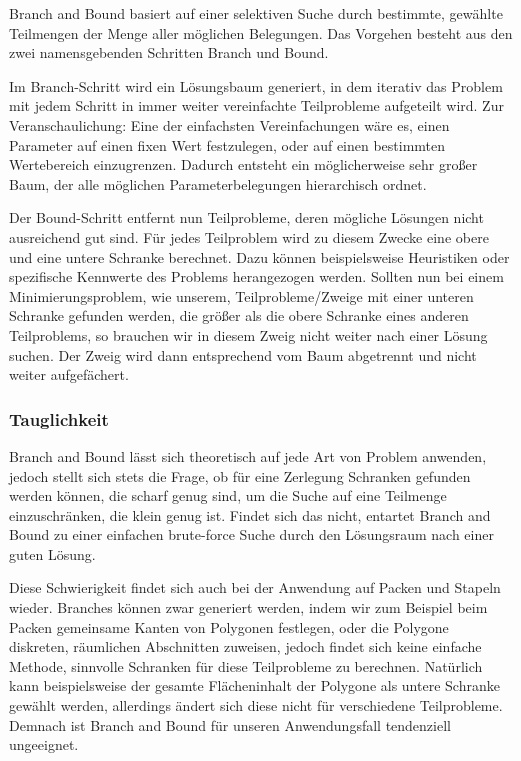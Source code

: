 \documentclass[runningheads,a4paper]{llncs}
\begin{document}
Branch and Bound basiert auf einer selektiven Suche durch bestimmte, gewählte Teilmengen der Menge aller möglichen Belegungen. Das Vorgehen besteht aus den zwei namensgebenden Schritten Branch und Bound.

Im Branch-Schritt wird ein Lösungsbaum generiert, in dem iterativ das Problem mit jedem Schritt in immer weiter vereinfachte Teilprobleme aufgeteilt wird. Zur Veranschaulichung: Eine der einfachsten Vereinfachungen wäre es, einen Parameter auf einen fixen Wert festzulegen, oder auf einen bestimmten Wertebereich einzugrenzen. 
Dadurch entsteht ein möglicherweise sehr großer Baum, der alle möglichen Parameterbelegungen hierarchisch ordnet.

Der Bound-Schritt entfernt nun Teilprobleme, deren mögliche Lösungen nicht ausreichend gut sind. Für jedes Teilproblem wird zu diesem Zwecke eine obere und eine untere Schranke berechnet. Dazu können beispielsweise Heuristiken oder spezifische Kennwerte des Problems herangezogen werden.
Sollten nun bei einem Minimierungsproblem, wie unserem, Teilprobleme/Zweige mit einer unteren Schranke gefunden werden, die größer als die obere Schranke eines anderen Teilproblems, so brauchen wir in diesem Zweig nicht weiter nach einer Lösung suchen. Der Zweig wird dann entsprechend vom Baum abgetrennt und nicht weiter aufgefächert.

\subsubsection{Tauglichkeit}

Branch and Bound lässt sich theoretisch auf jede Art von Problem anwenden, jedoch stellt sich stets die Frage, ob für eine Zerlegung Schranken gefunden werden können, die scharf genug sind, um die Suche auf eine Teilmenge einzuschränken, die klein genug ist. 
Findet sich das nicht, entartet Branch and Bound zu einer einfachen brute-force Suche durch den Lösungsraum nach einer guten Lösung.

Diese Schwierigkeit findet sich auch bei der Anwendung auf Packen und Stapeln wieder. Branches können zwar generiert werden, indem wir zum Beispiel beim Packen gemeinsame Kanten von Polygonen festlegen, oder die Polygone diskreten, räumlichen Abschnitten zuweisen, jedoch findet sich keine einfache Methode, sinnvolle Schranken für diese Teilprobleme zu berechnen. Natürlich kann beispielsweise der gesamte Flächeninhalt der Polygone als untere Schranke gewählt werden, allerdings ändert sich diese nicht für verschiedene Teilprobleme. Demnach ist Branch and Bound für unseren Anwendungsfall tendenziell ungeeignet.
\end{document}
